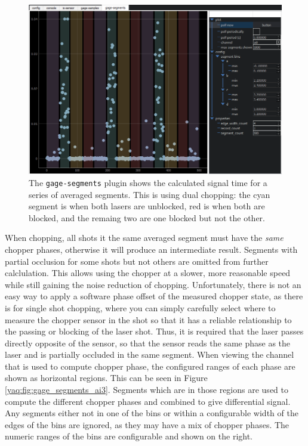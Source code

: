 \begin{landscape}
\begin{figure}
\includegraphics[width=8in]{"yaq/images/gage_segments_ai0"}
\caption[\yaqcqtpy{} Gage DAQ Plugin (segments)]{
	The \texttt{gage-segments} plugin shows the calculated signal time for a series of averaged segments.
	This is using dual chopping: the cyan segment is when both lasers are unblocked, red is when both are blocked, and the remaing two are one blocked but not the other.
}
\label{yaq:fig:gage_segments_ai0}
\end{figure}
\end{landscape}

When chopping, all shots it the same averaged segment must have the \textit{same} chopper phases, otherwise it will produce an intermediate result.
Segments with partial occlusion for some shots but not others are omitted from further calclulation.
This allows using the chopper at a slower, more reasonable speed while still gaining the noise reduction of chopping.
Unfortunately, there is not an easy way to apply a software phase offset of the measured chopper state, as there is for single shot chopping, where you can simply carefully select where to measure the chopper sensor in the shot so that it has a reliable relationship to the passing or blocking of the laser shot.
Thus, it is required that the laser passes directly opposite of the sensor, so that the sensor reads the same phase as the laser and is partially occluded in the same segment.
When viewing the channel that is used to compute chopper phase, the configured ranges of each phase are shown as horizontal regions.
This can be seen in Figure \ref{yaq:fig:gage_segments_ai3}.
Segments which are in those regions are used to compute the different chopper phases and combined to give differential signal.
Any segments either not in one of the bins or within a configurable width of the edges of the bins are ignored, as they may have a mix of chopper phases.
The numeric ranges of the bins are configurable and shown on the right.

